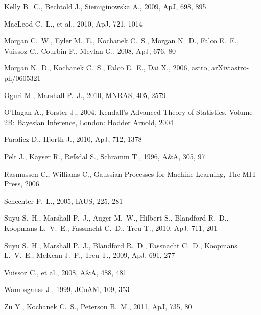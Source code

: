 \documentclass[useAMS,usenatbib, a4paper]{mn2e} \usepackage{natbib}
\begin{document}
\begin{thebibliography}{99}
 Kelly B.~C., Bechtold J., Siemiginowska A., 2009, ApJ, 698, 895 

 MacLeod C.~L., et al., 2010, ApJ, 721, 
1014 

Morgan C.~W., Eyler M.~E., Kochanek C.~S., Morgan N.~D., Falco E.~E., 
Vuissoz C., Courbin F., Meylan G., 2008, ApJ, 676, 80 

Morgan N.~D., Kochanek C.~S., Falco E.~E., Dai X., 2006, astro, 
arXiv:astro-ph/0605321 

 Oguri M., Marshall P.~J., 2010, MNRAS, 405, 2579 

 O'Hagan A., Forster J., 2004, Kendall's Advanced Theory of Statistics, Volume 2B: Bayesian Inference, London: Hodder Arnold, 2004

 Paraficz D., Hjorth J., 2010, ApJ, 712, 1378 

 Pelt J., Kayser R., Refsdal S., Schramm T., 1996, A\&A, 305, 97 

 Rasmussen C., Williams C., Gaussian Processes for Machine Learning, The MIT Press, 2006

Schechter P.~L., 2005, IAUS, 225, 281 

Suyu S.~H., Marshall P.~J., Auger M.~W., Hilbert S., Blandford R.~D., 
Koopmans L.~V.~E., Fassnacht C.~D., Treu T., 2010, ApJ, 711, 201 

Suyu S.~H., Marshall P.~J., Blandford R.~D., Fassnacht C.~D., Koopmans 
L.~V.~E., McKean J.~P., Treu T., 2009, ApJ, 691, 277 

 Vuissoz C., et al., 2008, A\&A, 488, 481 

Wambsganss J., 1999, JCoAM, 109, 353 

 Zu Y., Kochanek C.~S., Peterson B.~M., 2011, ApJ, 735, 80 
\end{thebibliography}
\end{document}
